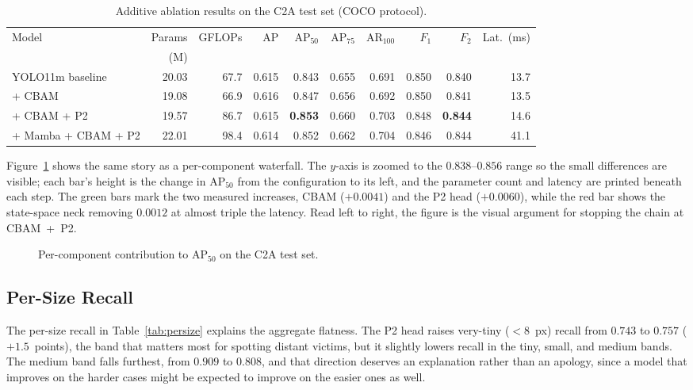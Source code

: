 \begin{table}[tbp]
  \centering
  \caption{Additive ablation results on the C2A test set (COCO protocol).}
  \label{tab:main}
  \small
  \setlength{\tabcolsep}{3pt}
  \begin{tabular}{@{}l r r r r r r r r r@{}}
    \toprule
    Model & Params & GFLOPs & AP & $\mathrm{AP}_{50}$ & $\mathrm{AP}_{75}$ & $\mathrm{AR}_{100}$ & $F_1$ & $F_2$ & Lat.\ (ms) \\
    & (M) & & & & & & & & \\
    \midrule
    YOLO11m baseline    & 20.03 & 67.7 & 0.615 & 0.843 & 0.655 & 0.691 & 0.850 & 0.840 & 13.7 \\
    + CBAM              & 19.08 & 66.9 & 0.616 & 0.847 & 0.656 & 0.692 & 0.850 & 0.841 & 13.5 \\
    + CBAM + P2         & 19.57 & 86.7 & 0.615 & \textbf{0.853} & 0.660 & 0.703 & 0.848 & \textbf{0.844} & 14.6 \\
    + Mamba + CBAM + P2 & 22.01 & 98.4 & 0.614 & 0.852 & 0.662 & 0.704 & 0.846 & 0.844 & 41.1 \\
    \bottomrule
  \end{tabular}
\end{table}

Figure~\ref{fig:waterfall} shows the same story as a per-component waterfall.
The $y$-axis is zoomed to the $0.838$--$0.856$ range so the small differences
are visible; each bar's height is the change in $\mathrm{AP}_{50}$ from the
configuration to its left, and the parameter count and latency are printed
beneath each step. The green bars mark the two measured increases, CBAM
($+0.0041$) and the P2 head ($+0.0060$), while the red bar shows the
state-space neck removing $0.0012$ at almost triple the latency. Read left to
right, the figure is the visual argument for stopping the chain at
CBAM~+~P2.

\begin{figure}[tbp]
  \centering
  
  \caption{Per-component contribution to $\mathrm{AP}_{50}$ on the C2A test set.}
  \label{fig:waterfall}
\end{figure}

\subsection{Per-Size Recall}
The per-size recall in Table~\ref{tab:persize} explains the aggregate
flatness. The P2 head raises very-tiny ($<8$~px) recall from $0.743$ to
$0.757$ ($+1.5$~points), the band that matters most for spotting distant
victims, but it slightly lowers recall in the tiny, small, and medium bands.
The medium band falls furthest, from $0.909$ to $0.808$, and that direction
deserves an explanation rather than an apology, since a model that improves on
the harder cases might be expected to improve on the easier ones as well.

